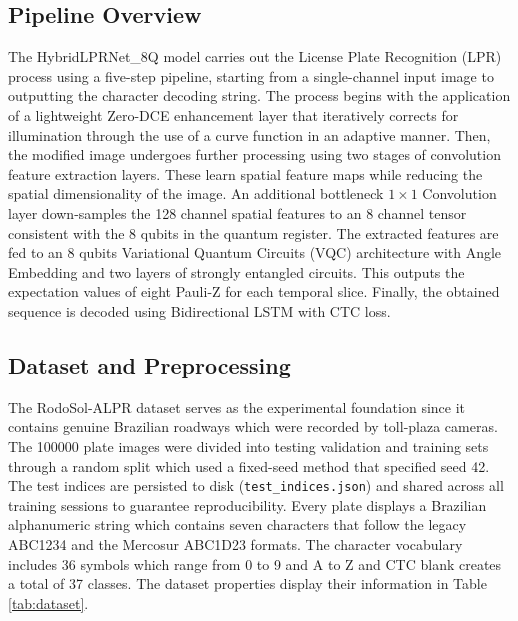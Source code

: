 \documentclass{ieeeaccess}
\begin{document}
\subsection{Pipeline Overview}
The HybridLPRNet\_8Q model carries out the License Plate Recognition (LPR) process using a five-step pipeline, starting from a single-channel input image to outputting the character decoding string. The process begins with the application of a lightweight Zero-DCE enhancement layer that iteratively corrects for illumination through the use of a curve function in an adaptive manner. Then, the modified image undergoes further processing using two stages of convolution feature extraction layers. These learn spatial feature maps while reducing the spatial dimensionality of the image. An additional bottleneck $1\times 1$ Convolution layer down-samples the 128 channel spatial features to an 8 channel tensor consistent with the 8 qubits in the quantum register. The extracted features are fed to an 8 qubits Variational Quantum Circuits (VQC) architecture with Angle Embedding and two layers of strongly entangled circuits. This outputs the expectation values of eight Pauli-Z for each temporal slice. Finally, the obtained sequence is decoded using Bidirectional LSTM with CTC loss.

\subsection{Dataset and Preprocessing}
The RodoSol-ALPR dataset \cite{b6} serves as the experimental foundation since it contains genuine Brazilian roadways which were recorded by toll-plaza cameras. The 100000 plate images were divided into testing validation and training sets through a random split which used a fixed-seed method that specified seed 42. The test indices are persisted to disk (\texttt{test\_indices.json}) and shared across all training sessions to guarantee reproducibility. Every plate displays a Brazilian alphanumeric string which contains seven characters that follow the legacy ABC1234 and the Mercosur ABC1D23 formats. The character vocabulary includes 36 symbols which range from 0 to 9 and A to Z and CTC blank creates a total of 37 classes. The dataset properties display their information in Table \ref{tab:dataset}.
\end{document}
